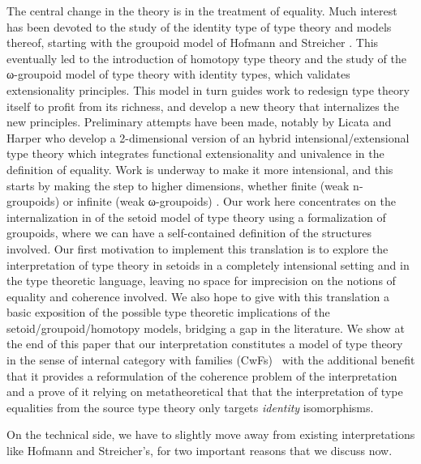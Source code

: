 The central change in the theory is in the treatment of equality.  Much
interest has been devoted to the study of the identity type of type
theory and models thereof, starting with the groupoid model of Hofmann
and Streicher \cite{groupoid-interp}. This eventually led to the
introduction of homotopy type theory and the study of the ω-groupoid
model of type theory with identity types, which validates extensionality
principles.
This model in turn
guides work to redesign type theory itself to profit from its
richness, and develop a new theory that internalizes the new
principles. Preliminary attempts have been made, notably by Licata and
Harper \cite{DBLP:conf/popl/LicataH12} who develop a 2-dimensional
version of an hybrid intensional/extensional type theory which
integrates functional extensionality and univalence in the definition
of equality. Work is underway to make it more intensional, and this
starts by making the step to higher dimensions, whether finite (weak
n-groupoids) or infinite (weak ω-groupoids)
\cite{DBLP:conf/csl/AltenkirchR12}. %
%
Our work here concentrates on the internalization in \Coq of the setoid
model of type theory using a formalization of groupoids, where we can have a
self-contained definition of the structures involved. 
%
Our first motivation to implement this translation is to explore the
interpretation of type theory in setoids in a completely intensional
setting and in the type theoretic language, leaving no space for
imprecision on the notions of equality and coherence involved.  We also
hope to give with this translation a basic exposition of the possible
type theoretic implications of the setoid/groupoid/homotopy models,
bridging a gap in the literature.
%
We show at the end of this paper that our interpretation constitutes a
model of type theory in the sense of internal category with families
(CwFs)~\cite{dybjer:internaltt} with the additional benefit that it
provides a reformulation of the coherence problem of the
interpretation and a prove of it relying on metatheoretical that that
the interpretation of type equalities from the source type theory only
targets \emph{identity} isomorphisms.

%
On the technical side, we have to slightly move away from existing
interpretations like Hofmann and Streicher's, for two important reasons
that we discuss now.


